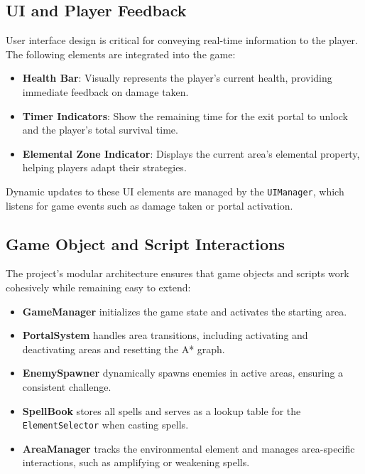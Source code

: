 \documentclass[10pt,twocolumn]{article}
\begin{document}
\subsection{UI and Player Feedback}
User interface design is critical for conveying real-time information to the player. The following elements are integrated into the game:
\begin{itemize}
    \item \textbf{Health Bar}: Visually represents the player’s current health, providing immediate feedback on damage taken.
    \item \textbf{Timer Indicators}: Show the remaining time for the exit portal to unlock and the player's total survival time.
    \item \textbf{Elemental Zone Indicator}: Displays the current area’s elemental property, helping players adapt their strategies.
\end{itemize}

Dynamic updates to these UI elements are managed by the \texttt{UIManager}, which listens for game events such as damage taken or portal activation.

\subsection{Game Object and Script Interactions}
The project’s modular architecture ensures that game objects and scripts work cohesively while remaining easy to extend:
\begin{itemize}
    \item \textbf{GameManager} initializes the game state and activates the starting area.
    \item \textbf{PortalSystem} handles area transitions, including activating and deactivating areas and resetting the A* graph.
    \item \textbf{EnemySpawner} dynamically spawns enemies in active areas, ensuring a consistent challenge.
    \item \textbf{SpellBook} stores all spells and serves as a lookup table for the \texttt{ElementSelector} when casting spells.
    \item \textbf{AreaManager} tracks the environmental element and manages area-specific interactions, such as amplifying or weakening spells.
\end{itemize}
\end{document}
